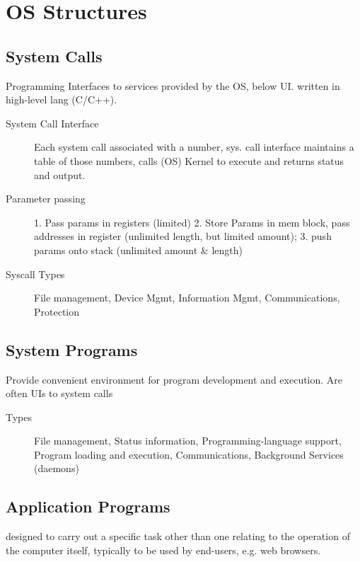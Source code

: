 \section*{OS Structures}

\subsection*{System Calls}
Programming Interfaces to services provided by the OS, below UI. written in high-level lang (C/C++). %
\begin{description}
    \item[System Call Interface] Each system call associated with a number, sys. call interface maintains a table of those numbers, calls (OS) Kernel to execute and returns status and output.
   \item[Parameter passing] 1. Pass params in registers (limited) 2. Store Params in mem block, pass addresses in register (unlimited length, but limited amount); 3. push params onto stack (unlimited amount \& length) %
  \item[Syscall Types] File management, Device Mgmt, Information Mgmt, Communications, Protection
\end{description}

\subsection*{System Programs}
Provide convenient environment for program development and execution. Are often UIs to system calls
\begin{description}
  \item[Types] File management, Status information, Programming-language support, Program loading and execution, Communications, Background Services (daemons)
\end{description}

\subsection*{Application Programs}
designed to carry out a specific task other than one relating to the operation of the computer itself, typically to be used by end-users, e.g. web browsers.



